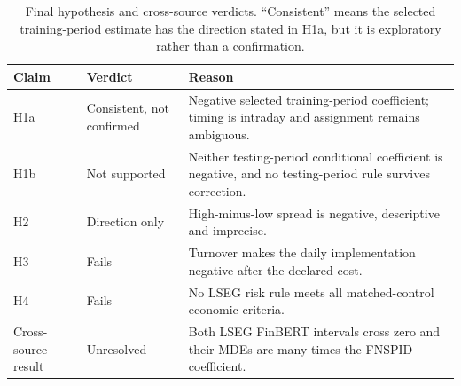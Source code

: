 \begin{table}[!ht]
\centering
\caption[Hypothesis and transfer verdicts]{Final hypothesis and cross-source verdicts. ``Consistent'' means the selected training-period estimate has the direction stated in H1a, but it is exploratory rather than a confirmation.}
\label{tab:hypothesis-verdicts}
\small
\begin{tabular}{@{}l >{\raggedright\arraybackslash}p{3.3cm} >{\raggedright\arraybackslash}p{8.0cm}@{}}
\toprule
Claim & Verdict & Reason \\
\midrule
H1a & Consistent, not confirmed & Negative selected training-period coefficient; timing is intraday and assignment remains ambiguous. \\
H1b & Not supported & Neither testing-period conditional coefficient is negative, and no testing-period rule survives correction. \\
H2 & Direction only & High-minus-low spread is negative, descriptive and imprecise. \\
H3 & Fails & Turnover makes the daily implementation negative after the declared cost. \\
H4 & Fails & No LSEG risk rule meets all matched-control economic criteria. \\
Cross-source result & Unresolved & Both LSEG FinBERT intervals cross zero and their MDEs are many times the FNSPID coefficient. \\
\bottomrule
\end{tabular}
\end{table}
